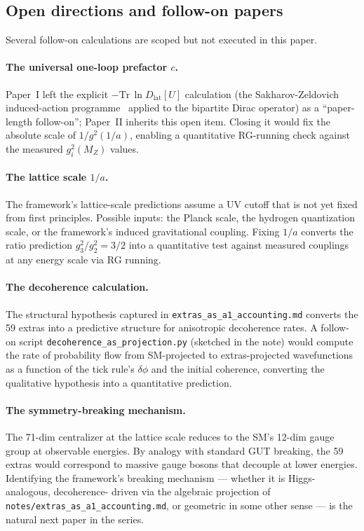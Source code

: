 \subsection{Open directions and follow-on papers}
\label{subsec:open_directions}

Several follow-on calculations are scoped but not executed in
this paper.

\paragraph{The universal one-loop prefactor $c$.}  Paper~I left
the explicit $-\mathrm{Tr}\,\ln D_\text{lat}[U]$ calculation
(the Sakharov-Zeldovich induced-action
programme~\cite{sakharov1968vacuum} applied to the bipartite
Dirac operator) as a ``paper-length follow-on''; Paper~II
inherits this open item.  Closing it would fix the absolute scale
of $1/g^2(1/a)$, enabling a quantitative RG-running check against
the measured $g_i^2(M_Z)$ values.

\paragraph{The lattice scale $1/a$.}  The framework's lattice-scale
predictions assume a UV cutoff that is not yet fixed from first
principles.  Possible inputs: the Planck scale, the hydrogen
quantization scale, or the framework's induced gravitational
coupling.  Fixing $1/a$ converts the ratio prediction
$g_3^2/g_2^2 = 3/2$ into a quantitative test against measured
couplings at any energy scale via RG running.

\paragraph{The decoherence calculation.}  The structural
hypothesis captured in \nolinkurl{extras_as_a1_accounting.md}
converts the 59 extras into a predictive structure for
anisotropic decoherence rates.  A follow-on script
\nolinkurl{decoherence_as_projection.py} (sketched in
the note) would compute the rate of probability flow from
SM-projected to extras-projected wavefunctions as a function of
the tick rule's $\delta\phi$ and the initial coherence,
converting the qualitative hypothesis into a quantitative
prediction.

\paragraph{The symmetry-breaking mechanism.}  The 71-dim
centralizer at the lattice scale reduces to the SM's 12-dim
gauge group at observable energies.  By analogy with standard GUT
breaking, the 59 extras would correspond to massive gauge bosons
that decouple at lower energies.  Identifying the framework's
breaking mechanism --- whether it is Higgs-analogous, decoherence-
driven via the algebraic projection of
\nolinkurl{notes/extras_as_a1_accounting.md}, or geometric in
some other sense --- is the natural next paper in the series.

